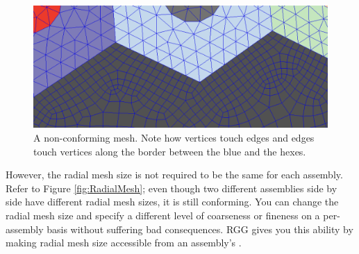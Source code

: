 \begin{figure}[H]
	\begin{center}
		\includegraphics[width=0.75\linewidth]{Images/nonconforming-mesh.png}
		\caption{A non-conforming mesh.  Note how vertices touch edges and edges touch vertices along the border between the blue and the hexes.}
		\label{fig:NonconformingMesh}
	\end{center}
\end{figure}

However, the radial mesh size is not required to be the same for each assembly.  Refer to Figure \ref{fig:RadialMesh}; even though two different assemblies side by side have different radial mesh sizes, it is still conforming. You can change the radial mesh size and specify a different level of coarseness or fineness on a per-assembly basis without suffering bad consequences.  RGG gives you this ability by making radial mesh size accessible from an assembly's .